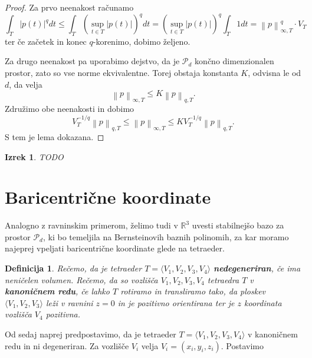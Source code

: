\documentclass[11pt,a4paper]{article}
\newtheorem{definition}{Definicija}
\newtheorem{theorem}{Izrek}
\begin{document}
\begin{proof}
    Za prvo neenakost računamo
    \begin{equation*}
        \int_{T} |p(t)|^q dt \le 
        \int_{T} \left( \sup_{t \in T} |p(t)| \right) ^q dt
        = \left( \sup_{t \in T} |p(t)| \right)^q \int_{T}1dt
        = \left\lVert p \right\rVert_{\infty , T}^{q} \cdot V_T
    \end{equation*}
    ter če začetek in konec $q$-korenimo, dobimo željeno.

    Za drugo neenakost pa uporabimo dejstvo, da je $\mathcal{P}_d$ končno dimenzionalen prostor, zato so vse norme ekvivalentne. Torej obstaja konstanta $K$, odvisna le od $d$, da velja
    \begin{equation}
        \left\lVert p \right\rVert_{\infty, T} \leq K \left\lVert p \right\rVert_{q,T}.
    \end{equation}
    Združimo obe neenakosti in dobimo
    \begin{equation}
        V_T^{-1/q} \left\lVert p \right\rVert_{q,T} \leq  \left\lVert p \right\rVert_{\infty, T} \leq K V_T^{-1/q} \left\lVert p \right\rVert_{q,T}.
    \end{equation}
    S tem je lema dokazana.
\end{proof}


\begin{theorem}
    TODO
\end{theorem}

\section{Baricentrične koordinate}

Analogno z ravninskim primerom, želimo tudi 
v $\mathbb{R}^3$ uvesti stabilnejšo bazo za prostor 
$\mathcal{P}_d$, ki bo temeljila na Bernsteinovih baznih polinomih,
za kar moramo najeprej vpeljati baricentrične koordinate glede na
tetraeder.

\begin{definition}
    Rečemo, da je tetraeder $T = \langle V_1, V_2, V_3, V_4 \rangle$ \textbf{nedegeneriran}, če ima neničelen volumen. Rečemo, da so vozlišča $V_1 , V_2 , V_3, V_4$ tetraedra $T$ v \textbf{kanoničnem redu}, če lahko $T$ rotiramo in transliramo  tako, da ploskev $\langle V_1, V_2, V_3\rangle$ leži v ravnini $z = 0$ in je pozitivno orientirana ter je $z$ koordinata vozlišča $V_4$ pozitivna.
\end{definition}

Od sedaj naprej predpostavimo, da je tetraeder $T = \langle V_1, V_2, V_3,V_4 \rangle$ v kanoničnem redu in ni degeneriran. 
Za vozlišče $V_i$ velja $V_i = (x_i, y_i, z_i)$. Postavimo 
\end{document}
